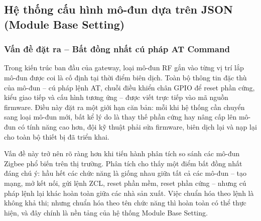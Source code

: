     \subsection{Hệ thống cấu hình mô-đun dựa trên JSON (Module Base Setting)}
        
        \subsubsection{Vấn đề đặt ra -- Bất đồng nhất cú pháp AT Command}
        
        Trong kiến trúc ban đầu của gateway, loại mô-đun RF gắn vào từng vị trí lắp mô-đun được coi là cố định tại thời điểm biên dịch. Toàn bộ thông tin đặc thù của mô-đun -- cú pháp lệnh AT, chuỗi điều khiển chân GPIO để reset phần cứng, kiểu giao tiếp và cấu hình tương ứng -- được viết trực tiếp vào mã nguồn firmware. Điều này đặt ra một giới hạn căn bản: mỗi khi hệ thống cần chuyển sang loại mô-đun mới, bất kể lý do là thay thế phần cứng hay nâng cấp lên mô-đun có tính năng cao hơn, đội kỹ thuật phải sửa firmware, biên dịch lại và nạp lại cho toàn bộ thiết bị đã triển khai.
        
        Vấn đề này trở nên rõ ràng hơn khi tiến hành phân tích so sánh các mô-đun Zigbee phổ biến trên thị trường. Phân tích cho thấy một điểm bất đồng nhất đáng chú ý: hầu hết các chức năng là giống nhau giữa tất cả các mô-đun -- tạo mạng, mở kết nối, gửi lệnh ZCL, reset phần mềm, reset phần cứng\cite{zigbee_spec_r21} -- nhưng cú pháp lệnh lại khác hoàn toàn giữa các nhà sản xuất. Việc chuẩn hóa theo lệnh là không khả thi; nhưng chuẩn hóa theo tên chức năng thì hoàn toàn có thể thực hiện, và đây chính là nền tảng của hệ thống Module Base Setting.
        
